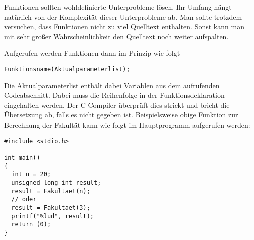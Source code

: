 Funktionen sollten wohldefinierte Unterprobleme lösen.
Ihr Umfang hängt natürlich von der Komplexität dieser Unterprobleme ab.
Man sollte trotzdem versuchen, dass Funktionen nicht zu viel Quelltext enthalten.
Sonst kann man mit sehr großer Wahrscheinlichkeit den Quelltext noch weiter aufspalten.

Aufgerufen werden Funktionen dann im Prinzip wie folgt
\begin{lstlisting}
Funktionsname(Aktualparameterlist);
\end{lstlisting}
Die Aktualparameterlist enthält dabei Variablen aus dem aufrufenden Codeabschnitt.
Dabei muss die Reihenfolge in der Funktionsdeklaration eingehalten werden.
Der C Compiler überprüft dies strickt und bricht die Übersetzung ab, falls es nicht gegeben ist.
Beispielsweise obige Funktion zur Berechnung der Fakultät kann wie folgt im Hauptprogramm aufgerufen werden:
\begin{lstlisting}
#include <stdio.h>

int main()
{
  int n = 20;
  unsigned long int result;
  result = Fakultaet(n);
  // oder
  result = Fakultaet(3);
  printf("%lud", result);
  return (0);
}
\end{lstlisting}

\endinput
